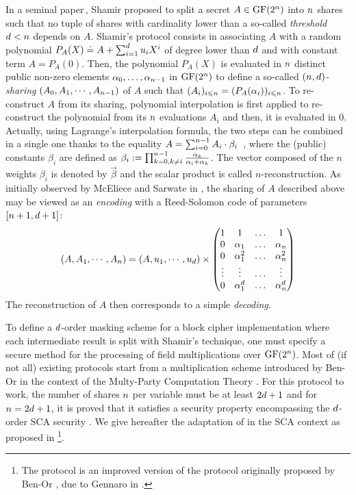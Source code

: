 \documentclass{llncs}
\begin{document}
In a seminal paper\,\cite{Sha79}, Shamir proposed to split a secret $A\in \GFn$ into $\nbShares$ shares such that
no tuple of shares with cardinality lower than a so-called {\em threshold} $\order<\nbShares$ depends on $A$. Shamir's
protocol consists in associating $A$ with a random polynomial $P_A(X)\doteq A + \sum_{i=1}^{\order}\polyCoef X^i$ of degree lower than $\order$ and with constant term $A=P_A(0)$. Then, the polynomial $P_A(X)$ is evaluated in $\nbShares$ distinct public non-zero elements $\pubElt[0], \ldots, \pubElt[n-1]$ in $\GFn$ to define a so-called {\em $(\nbShares,\order)$-sharing} $(A_0,A_1,\cdots,A_{\nbShares-1})$ of $A$ such that $(A_i)_{i\leqslant \nbShares}=(P_A(\alpha_i))_{i\leqslant \nbShares}$. To re-construct $A$ from its sharing, polynomial interpolation is first applied to re-construct the polynomial from its $\nbShares$ evaluations $A_i$ and then, it is evaluated in $0$. Actually, using Lagrange's
interpolation formula, the two steps can be combined in a single one thanks to the equality $ A=\sum_{i=0}^{\nbShares-1} A_i \cdot \beta_i\enspace$,  where the (public) constants $\beta_i$ are defined as $\beta_i:=\prod_{k=0,k\neq i}^{\nbShares-1} \frac{\alpha_k}{\alpha_i+\alpha_k}$. The vector composed of the $n$ weights $\beta_i$ is denoted by $\vec \beta$ and the scalar product is called $n$-reconstruction. As initially observed by McEliece and Sarwate in \cite{MS81}, the sharing of $A$ described above may be viewed as an {\em encoding} with a Reed-Solomon code of parameters $[\nbShares + 1,\order + 1]$:
$$
(A,A_1,\cdots,A_{\nbShares}) = (A,\polyCoef[1],\cdots,\polyCoef[\order])\times 
\left(\begin{matrix}
1 & 1 & \hdots & 1 \\
0 & \pubElt[1] & \hdots & \pubElt[\nbShares] \\
0 & \pubElt[1]^2 & \hdots & \pubElt[\nbShares]^2 \\
\vdots & \vdots & \hdots & \vdots \\
0 & \pubElt[1]^{\order} & \hdots & \pubElt[\nbShares]^{\order} 
\end{matrix}
\right)
$$
The reconstruction of $A$ then corresponds to a simple {\em decoding}.
\vspace{3mm}

To define a $\order$\myth-order masking scheme for a block cipher
implementation where each intermediate result is split with Shamir's
technique, one must specify a secure method for the processing of field
multiplications over $\GFn$. Most of (if not all) existing protocols start from a multiplication scheme introduced by
Ben-Or \etal in the context of the Multy-Party Computation Theory
\cite{BGW88}. For this protocol to work, the number of shares $\nbShares$ per variable must be at least $2\order+1$ and for $\nbShares=2\order+1$, it is proved that it satisfies a security property encompassing the $\order$\myth-order SCA security \cite{PR11}. We give hereafter the adaptation of
\cite{BGW88} in the 
SCA context as proposed in \cite{PR11,RP12}\footnote{The protocol is 
an improved version of the protocol originally proposed by Ben-Or \etal \cite{BGW88},
due to Gennaro \etal in \cite{GRR98}.}.
\end{document}
